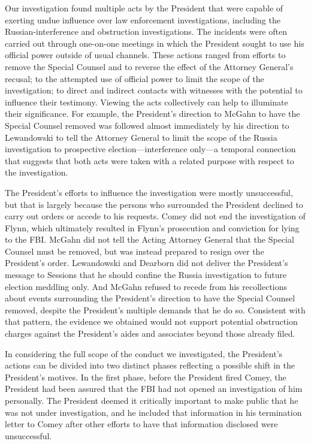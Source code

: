 {Our investigation found multiple acts by the President that were capable of exerting undue influence over law enforcement investigations, including the Russian-interference and obstruction investigations.
The incidents were often carried out through one-on-one meetings in which the President sought to use his official power outside of usual channels.
These actions ranged from efforts to remove the Special Counsel and to reverse the effect of the Attorney General's recusal; to the attempted use of official power to limit the scope of the investigation; to direct and indirect contacts with witnesses with the potential to influence their testimony.
Viewing the acts collectively can help to illuminate their significance.
For example, the President's direction to McGahn to have the Special Counsel removed was followed almost immediately by his direction to Lewandowski to tell the Attorney General to limit the scope of the Russia investigation to prospective election---interference only---a temporal connection that suggests that both acts were taken with a related purpose with respect to the investigation.

The President's efforts to influence the investigation were mostly unsuccessful, but that is largely because the persons who surrounded the President declined to carry out orders or accede to his requests.
Comey did not end the investigation of Flynn, which ultimately resulted in Flynn's prosecution and conviction for lying to the FBI\null.
McGahn did not tell the Acting Attorney General that the Special Counsel must be removed, but was instead prepared to resign over the President's order.
Lewandowski and Dearborn did not deliver the President's message to Sessions that he should confine the Russia investigation to future election meddling only.
And McGahn refused to recede from his recollections about events surrounding the President's direction to have the Special Counsel removed, despite the President's multiple demands that he do so.
Consistent with that pattern, the evidence we obtained would not support potential obstruction charges against the President's aides and associates beyond those already filed.

In considering the full scope of the conduct we investigated, the President's actions can be divided into two distinct phases reflecting a possible shift in the President's motives.
In the first phase, before the President fired Comey, the President had been assured that the FBI had not opened an investigation of him personally.
The President deemed it critically important to make public that he was not under investigation, and he included that information in his termination letter to Comey after other efforts to have that information disclosed were unsuccessful.

}
